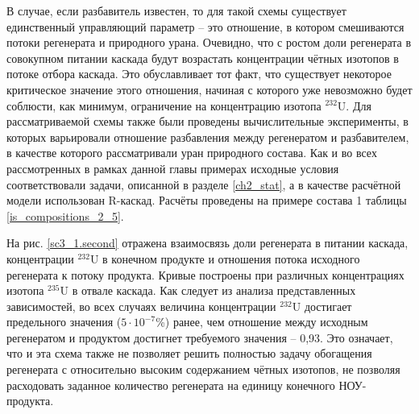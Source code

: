 В случае, если разбавитель известен, то для такой схемы существует единственный управляющий параметр -- это отношение, в котором смешиваются потоки регенерата и природного урана. Очевидно, что с ростом доли регенерата в совокупном питании каскада будут возрастать концентрации чётных изотопов в потоке отбора каскада. Это обуславливает тот факт, что существует некоторое критическое значение этого отношения, начиная с которого уже невозможно будет соблюсти, как минимум, ограничение на концентрацию изотопа $^{232}$U. Для рассматриваемой схемы также были проведены вычислительные эксперименты, в которых варьировали отношение разбавления между регенератом и разбавителем, в качестве которого рассматривали уран природного состава. Как и во всех рассмотренных в рамках данной главы примерах исходные условия соответствовали задачи, описанной в разделе \ref{ch2_stat}, а в качестве расчётной модели использован R-каскад. Расчёты проведены на примере состава 1 таблицы \ref{is_compositions_2_5}. 

На рис. \ref{sc3_1.second} отражена взаимосвязь доли регенерата в питании каскада, концентрации $^{232}$U в конечном продукте и отношения потока исходного регенерата к потоку продукта. Кривые построены при различных концентрациях изотопа $^{235}$U в отвале каскада. Как следует из анализа представленных зависимостей, во всех случаях величина концентрации  $^{232}$U достигает предельного значения ($5\cdot10^{-7}$\%) ранее, чем отношение между исходным регенератом и продуктом достигнет требуемого значения -- 0,93. Это означает, что и эта схема также не позволяет решить полностью задачу обогащения регенерата с относительно высоким содержанием чётных изотопов, не позволяя расходовать заданное количество регенерата на единицу конечного НОУ-продукта. 


